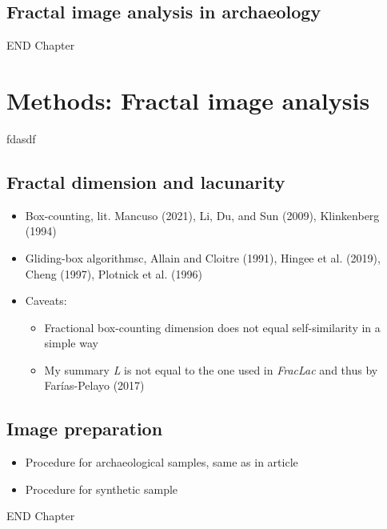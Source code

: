 \documentclass[
  12pt,
]{book}
\begin{document}
\hypertarget{image-archaeo}{%
\section{Fractal image analysis in archaeology}\label{image-archaeo}}

END Chapter

\hypertarget{images-methods}{%
\chapter{Methods: Fractal image analysis}\label{images-methods}}

fdasdf

\hypertarget{fractal-dimension-and-lacunarity}{%
\section{Fractal dimension and lacunarity}\label{fractal-dimension-and-lacunarity}}

\begin{itemize}
\item
  Box-counting, lit. Mancuso (2021), Li, Du, and Sun (2009), Klinkenberg (1994)
\item
  Gliding-box algorithmsc, Allain and Cloitre (1991), Hingee et al. (2019), Cheng (1997), Plotnick et al. (1996)
\item
  Caveats:

  \begin{itemize}
  \item
    Fractional box-counting dimension does not equal self-similarity in a simple way
  \item
    My summary \emph{L} is not equal to the one used in \emph{FracLac} and thus by Farías-Pelayo (2017)
  \end{itemize}
\end{itemize}

\hypertarget{image-preparation}{%
\section{Image preparation}\label{image-preparation}}

\begin{itemize}
\item
  Procedure for archaeological samples, same as in article
\item
  Procedure for synthetic sample
\end{itemize}

END Chapter
\end{document}

